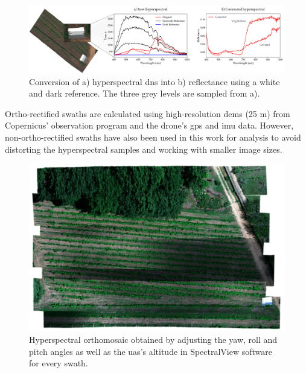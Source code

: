 \begin{figure}[ht]
    \centering
    \includegraphics{figs/materials/spectral_view_rectification.png}
    \caption{Conversion of a) hyperspectral \acrshort{dn}s into b) reflectance using a white and dark reference. The three grey levels are sampled from a).}
    \label{fig:hyperspectral_rectification}
\end{figure}

Ortho-rectified swaths are calculated using high-resolution \acrshort{dem}s (25 \si{\meter}) from Copernicus' observation program \cite{european_environment_agency_eu_2017} and the drone's \acrshort{gps} and \acrshort{imu} data. However, non-ortho-rectified swaths have also been used in this work for analysis to avoid distorting the hyperspectral samples and working with smaller image sizes.

\FloatBarrier
\begin{figure}[H]
    \centering
    \includegraphics[width=0.8\linewidth]{figs/materials/orthorectified_hyper.png}
    \caption{Hyperspectral orthomosaic obtained by adjusting the yaw, roll and pitch angles as well as the \acrshort{uas}'s altitude in SpectralView\texttrademark \hspace{.3mm} software for every swath.}
    \label{fig:orthorectified_hyper}
\end{figure}

